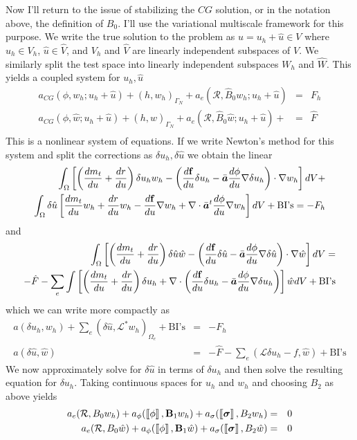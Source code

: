 \documentclass[10pt,dvips,twoside,reqno]{amsart}
\begin{document}
Now I'll return to the issue of stabilizing the $CG$ solution, or in
the notation above, the definition of $B_0$. I'll use the variational
multiscale framework for this purpose. We write the true solution to
the problem as $u = u_h + \hat{u} \in V$ where $u_h \in V_h$, $\hat{u}
\in \hat{V}$, and $V_h$ and $\hat{V}$ are linearly independent
subspaces of $V$. We similarly split the test space into linearly
independent subspaces $W_h$ and $\hat{W}$. This yields a coupled
system for $u_h,\hat{u}$
\begin{eqnarray}
 a_{CG}(\phi,w_h;u_h+\hat{u}) + (h,w_h)_{\Gamma_N}  + a_e(\mathcal{R}, \hat{B}_0 w_h;u_h+\hat{u}) &=& F_h \\ 
 a_{CG}(\phi,\hat{w};u_h+\hat{u}) + (h,\hat{w})_{\Gamma_N}  + a_e(\mathcal{R}, \hat{B}_0 \hat{w};u_h+\hat{u}) + &=& \hat{F} \\ 
\end{eqnarray} 
This is a nonlinear system of equations. If we write Newton's method for this system and split the corrections as $\delta u_h,\delta \hat{u}$ we obtain the linear 
\begin{eqnarray}
\int_{\Omega} \left[ \left( \frac{d {m_t}}{d {u}} + \frac{d {r}}{d {u}} \right) \delta u_h w_h - \left( \frac{d {{\bf f}}}{d {u}} \delta u_h - \bar{\mbox{{\boldmath ${a}$}}} \frac{d {\phi}}{d {u}} \nabla \delta u_h \right) \cdot \nabla w_h \right] dV + \\
\int_{\Omega} \delta \hat{u} \left[ \frac{d {m_t}}{d {u}} w_h  + \frac{d {r}}{d {u}} w_h - \frac{d {{\bf f}}}{d {u}} \nabla w_h + \nabla \cdot \bar{\mbox{{\boldmath ${a}$}}}^t \frac{d {\phi}}{d {u}} \nabla w_h \right] dV + \mbox{BI's} = -F_h
\end{eqnarray}
and
\begin{eqnarray}
\int_{\Omega} \left[ \left( \frac{d {m_t}}{d {u}} + \frac{d {r}}{d {u}} \right) \delta \hat{u} \hat{w} - \left( \frac{d {{\bf f}}}{d {u}} \delta \hat{u} - \bar{\mbox{{\boldmath ${a}$}}} \frac{d {\phi}}{d {u}} \nabla \delta \hat{u} \right) \cdot \nabla \hat{w} \right] dV = \\
-\hat{F} - \sum_e \int \left[ \left( \frac{d {m_t}}{d {u}} + \frac{d {r}}{d {u}} \right) \delta u_h + \nabla \cdot \left( \frac{d {{\bf f}}}{d {u}} \delta u_h - \bar{\mbox{{\boldmath ${a}$}}} \frac{d {\phi}}{d {u}} \nabla \delta u_h \right) \right] \hat{w} dV + \mbox{BI's}
\end{eqnarray}
which we can write more compactly as 
\begin{eqnarray}
a(\delta u_h, w_h) + \sum_{e} (\delta \hat{u},\mathcal{L}^* w_h)_{\Omega_e} + \mbox{BI's} &=& - F_h \\
a(\delta \hat{u},\hat{w}) &=& - \hat{F} - \sum_e (\mathcal{L} \delta u_h - f,\hat{w}) + \mbox{BI's}
\end{eqnarray}
We now approximately solve for $\delta \hat{u}$ in terms of $\delta u_h$ and then solve the resulting equation for $\delta u_h$.
Taking continuous spaces for $u_h$ and $w_h$ and choosing $B_2$ as above yields
\begin{eqnarray}
a_e(\mathcal{R},B_0 w_h) + a_{\phi}(\dbl \phi \dbr, \vec B_1 w_h) + a_{\sigma}(\dbl \gvec \sigma \dbr, B_2 w_h) &=& 0 \\
a_e(\mathcal{R},B_0 \hat{w}) + a_{\phi}(\dbl \phi \dbr, \vec B_1 \hat{w}) + a_{\sigma}(\dbl \gvec \sigma \dbr, B_2 \hat{w}) &=& 0 
\end{eqnarray} 
\end{document}
